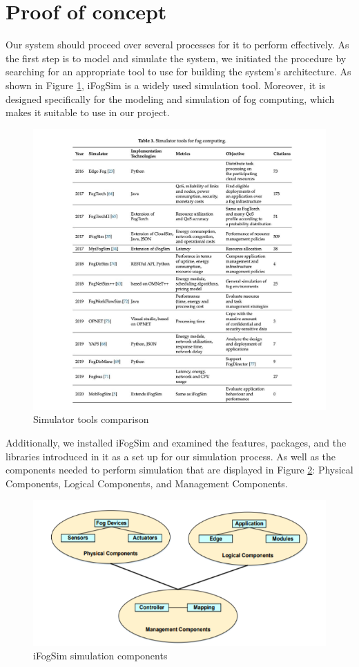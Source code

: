 \documentclass[12pt]{article}
\begin{document}
\section{Proof of concept}
Our system should proceed over several processes for it to perform effectively. As the first step is to model and simulate the system, we initiated the procedure by searching for an appropriate tool to use for building the system's architecture. As shown in Figure \ref{Sim}, iFogSim is a widely used simulation tool. Moreover, it is designed specifically for the modeling and simulation of fog computing, which makes it suitable to use in our project.
\begin{figure}[htp]
    \centering
    \includegraphics[width=13cm]{WhatsApp Image 2020-10-24 at 4.45.29 PM.jpeg}
    \caption{Simulator tools comparison}
    \label{Sim}
\end{figure}
\newpage
Additionally, we installed iFogSim and examined the features, packages, and the libraries introduced in it as a set up for our simulation process. As well as the components needed to perform simulation that are displayed in Figure \ref{ifogsim}: Physical Components, Logical Components, and Management Components.
\begin{figure}[htp]
    \centering
    \includegraphics[width=20cm]{Screenshot (149).png}
    \caption{iFogSim simulation components}
    \label{ifogsim}
\end{figure}
\end{document}
